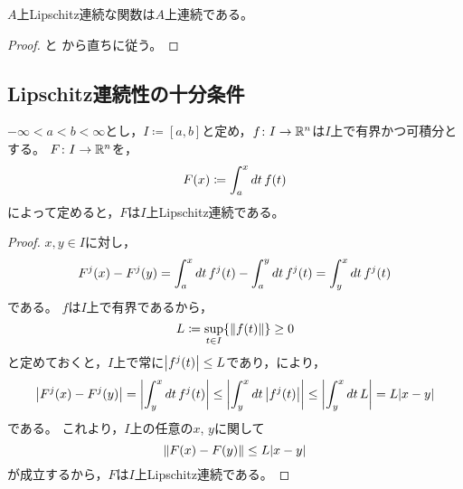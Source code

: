 \documentclass[b5paper,draft]{ltjsbook}
\begin{document}
\begin{cor}
    $A$上Lipschitz連続な関数は$A$上連続である。
    \begin{proof}
        と
        から直ちに従う。
    \end{proof}
\end{cor}



\subsection{Lipschitz連続性の十分条件}


\begin{prop}[原始関数のLipschitz連続性]
    $-\infty<a<b<\infty$とし，$I\coloneqq [a,b]$と定め，$f\colon I\to \mathbb{R}^n$は$I$上で有界かつ可積分とする。
    $F\colon I\to \mathbb{R}^n$を，
    \begin{equation}
        \fun{F}{x}\coloneqq \int_a^x dt\, \fun{f}{t}
    \end{equation}
    によって定めると，$F$は$I$上Lipschitz連続である。
    \begin{proof}
        $x,y\in I$に対し，
        \begin{equation}
            \fun{F^j}{x}-\fun{F^j}{y}=\int_a^x dt\, \fun{f^j}{t} - \int_a^y dt\, \fun{f^j}{t}=\int_y^x dt\, \fun{f^j}{t}
        \end{equation}
        である。
        $f$は$I$上で有界であるから，
        \begin{equation}
            L\coloneqq \sup_{t\in I}\bra{\norm{\fun{f}{t}}}\geq 0
        \end{equation}
        と定めておくと，$I$上で常に$\abs{\fun{f^j}{t}}\leq L$であり，により，
        \begin{equation}
            \abs{\fun{F^j}{x}-\fun{F^j}{y}}=\abs{\int_y^x dt\, \fun{f^j}{t}}
            \leq \abs{\int_y^x dt\, \abs{\fun{f^j}{t}}}\leq \abs{\int_y^x dt\, L}
            = L\abs{x-y}
        \end{equation}
        である。
        これより，$I$上の任意の$x$, $y$に関して
        \begin{equation}
            \norm{\fun{F}{x}-\fun{F}{y}}\leq L\abs{x-y}
        \end{equation}
        が成立するから，$F$は$I$上Lipschitz連続である。
    \end{proof}
\end{prop}
\end{document}
